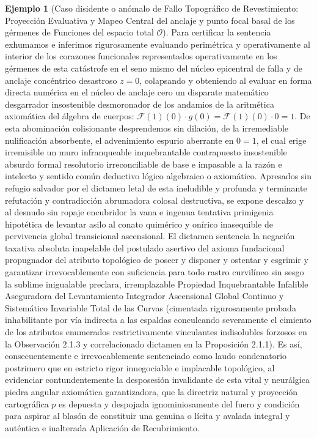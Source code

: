 \documentclass[11pt,a4paper]{article}
\theoremstyle{definition}
\newtheorem{ejemplo}{Ejemplo}[section]
\theoremstyle{remark}
\numberwithin{equation}{section}
\begin{document}
\begin{ejemplo}[Caso disidente o anómalo de Fallo Topográfico de Revestimiento: Proyección Evaluativa y Mapeo Central del anclaje y punto focal basal de los gérmenes de Funciones del espacio total $\mathcal{O}$]
Para certificar la sentencia exhumamos e inferimos rigurosamente evaluando perimétrica y operativamente al interior de los corazones funcionales representados operativamente en los gérmenes de esta catástrofe en el seno mismo del núcleo epicentral de falla y de anclaje concéntrico desastroso $z=0$, colapsando y obteniendo al evaluar en forma directa numérica en el núcleo de anclaje cero un disparate matemático desgarrador insostenible desmoronador de los andamios de la aritmética axiomática del álgebra de cuerpos: $\mathcal{F}(1)(0) \cdot g(0) = \mathcal{F}(1)(0) \cdot 0 = 1$. De esta abominación colisionante desprendemos sin dilación, de la irremediable nulificación absorbente, el advenimiento espurio aberrante en $0 = 1$, el cual erige irremisible un muro infranqueable inquebrantable contrapuesto insostenible absurdo formal resolutorio irreconciliable de base e impasable a la razón e intelecto y sentido común deductivo lógico algebraico o axiomático.
Apresados sin refugio salvador por el dictamen letal de esta ineludible y profunda y terminante refutación y contradicción abrumadora colosal destructiva, se expone descalzo y al desnudo sin ropaje encubridor la vana e ingenua tentativa primigenia hipotética de levantar asilo al conato quimérico y onírico inasequible de pervivencia global transicional ascensional. El dictamen sentencia la negación taxativa absoluta inapelable del postulado asertivo del axioma fundacional propugnador del atributo topológico de poseer y disponer y ostentar y esgrimir y garantizar irrevocablemente con suficiencia para todo rastro curvilíneo sin sesgo la sublime inigualable preclara, irremplazable Propiedad Inquebrantable Infalible Aseguradora del Levantamiento Integrador Ascensional Global Continuo y Sistemático Invariable Total de las Curvas (cimentada rigurosamente probada inhabilitante por vía indirecta a las espaldas conculcando severamente el cimiento de los atributos enumerados restrictivamente vinculantes indisolubles forzosos en la Observación 2.1.3 y correlacionado dictamen en la Proposición 2.1.1). Es así, consecuentemente e irrevocablemente sentenciado como laudo condenatorio postrimero que en estricto rigor innegociable e implacable topológico, al evidenciar contundentemente la desposesión invalidante de esta vital y neurálgica piedra angular axiomática garantizadora, que la directriz natural y proyección cartográfica $p$ es depuesta y despojada ignominiosamente del fuero y condición para aspirar al blasón de constituir una genuina o lícita y avalada integral y auténtica e inalterada Aplicación de Recubrimiento.


\end{ejemplo}
\end{document}

